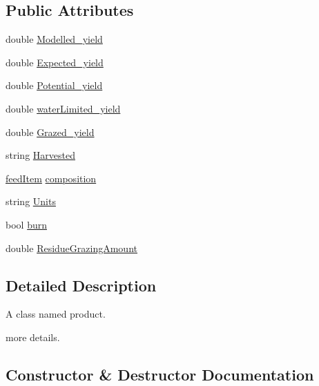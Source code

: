 \subsection*{Public Attributes}
\begin{DoxyCompactItemize}
\item 
double \mbox{\hyperlink{class_global_vars_1_1product_ac2d7444e7aabe254f54ed1ebca0e88bb}{Modelled\+\_\+yield}}
\item 
double \mbox{\hyperlink{class_global_vars_1_1product_a78c344aa33ebb4f6fdb0f35cb5d0e1ad}{Expected\+\_\+yield}}
\item 
double \mbox{\hyperlink{class_global_vars_1_1product_ab9c34bb3d521c157b2999f5cc1830b6b}{Potential\+\_\+yield}}
\item 
double \mbox{\hyperlink{class_global_vars_1_1product_a64f412746041cc314030a2297e238416}{water\+Limited\+\_\+yield}}
\item 
double \mbox{\hyperlink{class_global_vars_1_1product_a80072c7cc117a0677ba9d7acf309074e}{Grazed\+\_\+yield}}
\item 
string \mbox{\hyperlink{class_global_vars_1_1product_ab2fc244d1ed43617cb8243da8497d936}{Harvested}}
\item 
\mbox{\hyperlink{classfeed_item}{feed\+Item}} \mbox{\hyperlink{class_global_vars_1_1product_acdeb3bb369f0d36396bbdc29a0889116}{composition}}
\item 
string \mbox{\hyperlink{class_global_vars_1_1product_ac94f9aceece53d5aabd1b050479d2b7f}{Units}}
\item 
bool \mbox{\hyperlink{class_global_vars_1_1product_a35d152639ec1155df07babeb5b37e33c}{burn}}
\item 
double \mbox{\hyperlink{class_global_vars_1_1product_afa45609d86fb5f1738836bfbf343ccff}{Residue\+Grazing\+Amount}}
\end{DoxyCompactItemize}


\subsection{Detailed Description}
A class named product. 

more details. 

\subsection{Constructor \& Destructor Documentation}
\mbox{\label{class_global_vars_1_1product_a98e409001908cf1b15212222ce84c22a}} 
